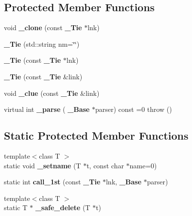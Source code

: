 \subsection*{Protected Member Functions}
\begin{DoxyCompactItemize}
\item 
\mbox{\label{classbnf_1_1___tie_ae1a6db1009a1212f8d9297446dea3af5}} 
void {\bfseries \+\_\+clone} (const \textbf{ \+\_\+\+Tie} $\ast$lnk)
\item 
\mbox{\label{classbnf_1_1___tie_a5acb87106d25769797a347fba072dcbd}} 
{\bfseries \+\_\+\+Tie} (std\+::string nm=\char`\"{}\char`\"{})
\item 
\mbox{\label{classbnf_1_1___tie_a4fea3452db346af8ff973c94068f3e4a}} 
{\bfseries \+\_\+\+Tie} (const \textbf{ \+\_\+\+Tie} $\ast$lnk)
\item 
\mbox{\label{classbnf_1_1___tie_a1d2910459130d3377281fe40053b8b72}} 
{\bfseries \+\_\+\+Tie} (const \textbf{ \+\_\+\+Tie} \&link)
\item 
\mbox{\label{classbnf_1_1___tie_a76631238fac475a2a9b6adfe8e31b529}} 
void {\bfseries \+\_\+clue} (const \textbf{ \+\_\+\+Tie} \&link)
\item 
\mbox{\label{classbnf_1_1___tie_a3ef41cf1dbd1d28f3f1ab22256ea3bd8}} 
virtual int {\bfseries \+\_\+parse} (\textbf{ \+\_\+\+Base} $\ast$parser) const =0  throw ()
\end{DoxyCompactItemize}
\subsection*{Static Protected Member Functions}
\begin{DoxyCompactItemize}
\item 
\mbox{\label{classbnf_1_1___tie_a2e6c961a8607120b153024a83bf7e046}} 
{\footnotesize template$<$class T $>$ }\\static void {\bfseries \+\_\+setname} (T $\ast$t, const char $\ast$name=0)
\item 
\mbox{\label{classbnf_1_1___tie_af1bc0dc1dfc73e91de8d3aef513b12e0}} 
static int {\bfseries call\+\_\+1st} (const \textbf{ \+\_\+\+Tie} $\ast$lnk, \textbf{ \+\_\+\+Base} $\ast$parser)
\item 
\mbox{\label{classbnf_1_1___tie_ade0d3607f99af81e30b336bf73087b8e}} 
{\footnotesize template$<$class T $>$ }\\static T $\ast$ {\bfseries \+\_\+safe\+\_\+delete} (T $\ast$t)
\end{DoxyCompactItemize}
